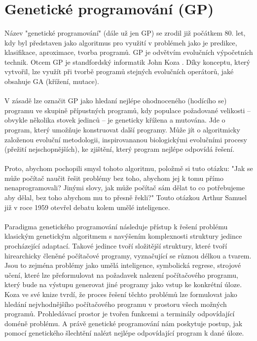 \documentclass[bc,male,java,dept460]{diploma}		%
\begin{document}
\section{Genetické programování (GP)}
\paragraph*{}
Název "genetické programování" (dále už jen GP) se zrodil již počátkem 80. let, kdy byl představen jako algoritmus pro využití v problémeh jako je predikce, klasifikace, aproximace, tvorba programů. GP je odvětvím evolučních výpočetních technik.
Otcem GP je standfordský informatik John Koza \cite{kozagp,kozagp2}. Díky konceptu, který vytvořil, lze využít při tvorbě programů stejných evolučních operátorů, jaké obsahuje GA (křížení, mutace).

\paragraph*{}
V zásadě lze označit GP jako hledaní nejlépe ohodnoceného (hodícího se) programu ve skupině přípustných programů, kdy populace požadované velikosti – obvykle několika stovek jedinců – je geneticky křížena a mutována.
Jde o program, který umožňuje konstruovat další programy. Může jít o algoritmicky založenou evoluční metodologii, inspirovananou biologickými evolučními procesy (přežití nejschopnějších), ke zjištění, který program nejlépe odpovídá řešení.

\paragraph*{}
Proto, abychom pochopili smysl tohoto algoritmu, položmě si tuto otázku: "Jak se může počítač naučit řešit  problémy bez toho, abychom jej k tomu přímo nenaprogramovali? Jinými slovy, jak může počítač sám dělat to co potřebujeme aby dělal, bez toho abychom mu to přesně řekli?" Touto otázkou Arthur Samuel již v roce 1959 otevřel debatu kolem umělé inteligence.

\paragraph*{}
Paradigma genetického programování následuje přístup k řešení problému klasickým genetickým algoritmem s navýšením komplexnosti struktury jedince procházející adaptací. Takové jedince tvoří složitější struktury, které tvoří hirearchicky členěné počítačové programy, vyznačující se různou délkou a tvarem. Jsou to zejména problémy jako umělá inteligence, symbolická regrese, strojové učení, které lze přeformulovat na požadavek nalezení počítačového programu, který bude na výstupu generovat jiné programy jako vstup ke konkrétní úloze. Koza ve své knize tvrdí, že proces řešení těchto problémů lze formulovat jako hledání nejvhodnějšího počítačového programu v prostoru všech možných programů. Prohledávací prostor je tvořen funkcemi a terminály odpovídající doméně problému. A právě genetické programování nám poskytuje postup, jak pomocí genetického šlechtění nalézt nejlépe odpovídající program k dané úloze.
\end{document}
